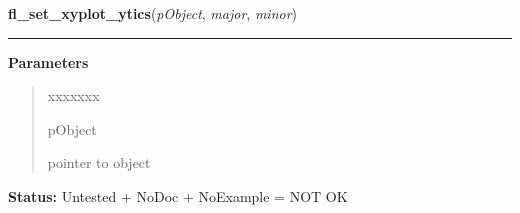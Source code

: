     \label{xformslib:library:fl_set_xyplot_ytics}

    \vspace{0.5ex}

\hspace{.8\funcindent}\begin{boxedminipage}{\funcwidth}

    \raggedright \textbf{fl\_set\_xyplot\_ytics}(\textit{pObject}, \textit{major}, \textit{minor})

    \vspace{-1.5ex}

    \rule{\textwidth}{0.5\fboxrule}
\setlength{\parskip}{2ex}
\setlength{\parskip}{1ex}
      \textbf{Parameters}
      \vspace{-1ex}

      \begin{quote}
        \begin{Ventry}{xxxxxxx}

          \item[pObject]

          pointer to object

        \end{Ventry}

      \end{quote}

\textbf{Status:} Untested + NoDoc + NoExample = NOT OK



    \end{boxedminipage}

    \label{xformslib:library:fl_set_xyplot_xbounds}

    \vspace{0.5ex}

